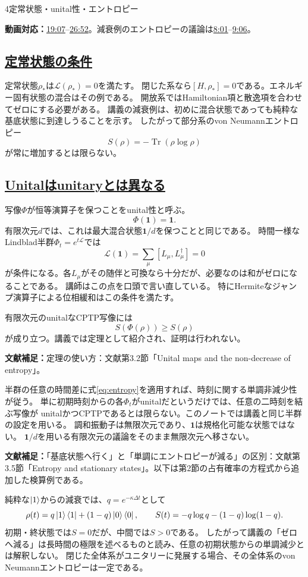 \documentclass[a4paper,11pt]{ltjsarticle}
\newcommand{\subsectionlink}[1]{\subsection[#1]{\hyperlink{toc}{#1}}}
\numberwithin{equation}{section}
\newcommand{\Tr}{\operatorname{Tr}}
\newcommand{\id}{\mathbf{1}}
\newcommand{\video}[2]{\href{https://www.youtube.com/watch?v=RYxzcUhIHjk\&t=#1s}{#2}}
\newcommand{\videosource}[1]{\par\noindent\textcolor{noteblue}{\textbf{動画対応：}#1}\par\smallskip}
\newcommand{\supplement}[1]{\par\medskip\noindent\textcolor{notered}{\textbf{文献補足：}}#1\par\smallskip}
\begin{document}
\begin{lecturesection}{4}{定常状態・unital性・エントロピー}
\label{sec:unital}
\videosource{\video{1147}{19:07}--\video{1612}{26:52}。減衰例のエントロピーの議論は\video{481}{8:01}--\video{546}{9:06}。}
\subsectionlink{定常状態の条件}
定常状態$\rho_*$は$\mathcal L(\rho_*)=0$を満たす。
閉じた系なら$[H,\rho_*]=0$である。エネルギー固有状態の混合はその例である。
開放系ではHamiltonian項と散逸項を合わせてゼロにする必要がある。
講義の減衰例は、初めに混合状態であっても純粋な基底状態に到達しうることを示す。
したがって部分系のvon Neumannエントロピー
\begin{equation}S(\rho)=-\Tr(\rho\log\rho)\end{equation}
が常に増加するとは限らない。

\subsectionlink{Unitalはunitaryとは異なる}
写像$\Phi$が恒等演算子を保つことをunital性と呼ぶ。
\begin{equation}\Phi(\id)=\id.\end{equation}
有限次元$d$では、これは最大混合状態$\id/d$を保つことと同じである。
時間一様なLindblad半群$\Phi_t=e^{t\mathcal L}$では
\begin{equation}
 \mathcal L(\id)=\sum_\mu[L_\mu,L_\mu^\dagger]=0
 \label{eq:unital}
\end{equation}
が条件になる。各$L_\mu$がその随伴と可換なら十分だが、必要なのは和がゼロになることである。
講師はこの点を口頭で言い直している。
特にHermiteなジャンプ演算子による位相緩和はこの条件を満たす。

有限次元のunitalなCPTP写像には
\begin{equation}S(\Phi(\rho))\ge S(\rho)\label{eq:entropy}
\end{equation}
が成り立つ。講義では定理として紹介され、証明は行われない。

\supplement{定理の使い方：文献\cite{Pajer:2026fuo}第3.2節「Unital maps and the non-decrease of entropy」。}
半群の任意の時間差に式\eqref{eq:entropy}を適用すれば、時刻に関する単調非減少性が従う。
単に初期時刻からの各$\Phi_t$がunitalだというだけでは、任意の二時刻を結ぶ写像が
unitalかつCPTPであるとは限らない。このノートでは講義と同じ半群の設定を用いる。
調和振動子は無限次元であり、$\id$は規格化可能な状態ではない。
$\id/d$を用いる有限次元の議論をそのまま無限次元へ移さない。

\supplement{「基底状態へ行く」と「単調にエントロピーが減る」の区別：文献\cite{Pajer:2026fuo}第3.5節「Entropy and stationary states」。以下は第2節の占有確率の方程式から追加した検算例である。}
純粋な$\ket1$からの減衰では、$q=e^{-\kappa\Delta t}$として
\begin{equation}
 \rho(t)=q\ket1\bra1+(1-q)\ket0\bra0,\qquad
 S(t)=-q\log q-(1-q)\log(1-q).
\end{equation}
初期・終状態では$S=0$だが、中間では$S>0$である。
したがって講義の「ゼロへ減る」は長時間の極限を述べるものと読み、任意の初期状態からの単調減少とは解釈しない。
閉じた全体系がユニタリーに発展する場合、その全体系のvon Neumannエントロピーは一定である。
\end{lecturesection}
\end{document}
